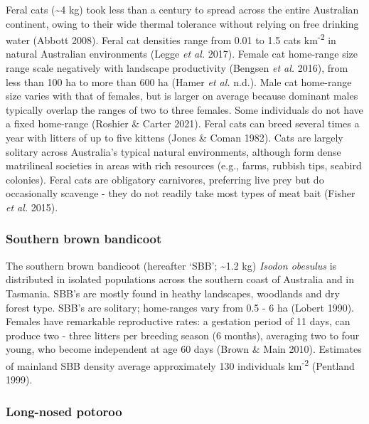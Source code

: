 \documentclass[11pt,a4paper,titlepage,twoside,openright]{style/unimelbthesis}
\begin{document}
\begin{mainmatter}
Feral cats (\textasciitilde4 kg) took less than a century to spread across the entire Australian continent, owing to their wide thermal tolerance without relying on free drinking water (Abbott 2008). Feral cat densities range from 0.01 to 1.5 cats km\textsuperscript{-2} in natural Australian environments (Legge \emph{et al.} 2017). Female cat home-range size range scale negatively with landscape productivity (Bengsen \emph{et al.} 2016), from less than 100 ha to more than 600 ha (Hamer \emph{et al.} n.d.). Male cat home-range size varies with that of females, but is larger on average because dominant males typically overlap the ranges of two to three females. Some individuals do not have a fixed home-range (Roshier \& Carter 2021). Feral cats can breed several times a year with litters of up to five kittens (Jones \& Coman 1982). Cats are largely solitary across Australia's typical natural environments, although form dense matrilineal societies in areas with rich resources (e.g., farms, rubbish tips, seabird colonies). Feral cats are obligatory carnivores, preferring live prey but do occasionally scavenge - they do not readily take most types of meat bait (Fisher \emph{et al.} 2015).

\hypertarget{southern-brown-bandicoot}{%
\subsubsection{Southern brown bandicoot}\label{southern-brown-bandicoot}}

The southern brown bandicoot (hereafter `SBB'; \textasciitilde1.2 kg) \emph{Isodon obesulus} is distributed in isolated populations across the southern coast of Australia and in Tasmania. SBB's are mostly found in heathy landscapes, woodlands and dry forest type. SBB's are solitary; home-ranges vary from 0.5 - 6 ha (Lobert 1990). Females have remarkable reproductive rates: a gestation period of 11 days, can produce two - three litters per breeding season (6 months), averaging two to four young, who become independent at age 60 days (Brown \& Main 2010). Estimates of mainland SBB density average approximately 130 individuals km\textsuperscript{-2} (Pentland 1999).

\hypertarget{long-nosed-potoroo}{%
\subsubsection{Long-nosed potoroo}\label{long-nosed-potoroo}}


\end{mainmatter}
\end{document}
